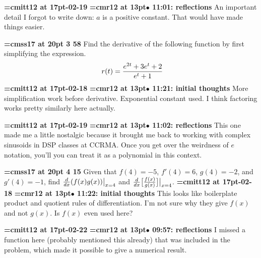 {\medskip\noindent\bf\font\titlefont=cmitt12 at 17pt-02-19}\medskip
{\smallskip\noindent\bf\font\titlefont=cmr12 at 13pt\titlefont $\bullet$ 11:01: reflections}\smallskip
An important detail I forgot to write down: $a$ is a positive constant. That would have made things easier.
\par

{\medskip\noindent\bf\font\titlefont=cmss17 at 20pt 3 58}\medskip
Find the derivative of the following function by first
simplifying the expression.
$$\
r(t) = {e^{2t} + 3e^{t} + 2 \over e^t + 1}
$$
{\medskip\noindent\bf\font\titlefont=cmitt12 at 17pt-02-18}\medskip
{\smallskip\noindent\bf\font\titlefont=cmr12 at 13pt\titlefont $\bullet$ 11:21: initial thoughts}\smallskip
More simplification work before derivative. Exponential constant used. I think factoring works pretty similarly here actually.
\par

{\medskip\noindent\bf\font\titlefont=cmitt12 at 17pt-02-19}\medskip
{\smallskip\noindent\bf\font\titlefont=cmr12 at 13pt\titlefont $\bullet$ 11:02: reflections}\smallskip
This one made me a little nostalgic because it brought me back to working with complex sinusoids in DSP classes at CCRMA. Once you get over the weirdness of $e$ notation, you'll you can treat it as a polynomial in this context.
\par

{\medskip\noindent\bf\font\titlefont=cmss17 at 20pt 4 15}\medskip
Given that $f(4) = -5$, $f'(4) = 6$, $g(4)=-2$, and $g'(4) = -1$,
find ${d \over dx}(f(x)g(x))\big|_{x = 4}$ and
${d \over dx}\big[{f(x) \over g(x)}\big]\big|_{x = 4}$.
{\medskip\noindent\bf\font\titlefont=cmitt12 at 17pt-02-18}\medskip
{\smallskip\noindent\bf\font\titlefont=cmr12 at 13pt\titlefont $\bullet$ 11:22: initial thoughts}\smallskip
This looks like boilerplate product and quotient rules of differentiation. I'm not sure why they give $f(x)$ and not $g(x)$. Is $f(x)$ even used here?
\par

{\medskip\noindent\bf\font\titlefont=cmitt12 at 17pt-02-22}\medskip
{\smallskip\noindent\bf\font\titlefont=cmr12 at 13pt\titlefont $\bullet$ 09:57: reflections}\smallskip
I missed a function here (probably mentioned this already) that was included in the problem, which made it possible to give a numerical result.
\par

